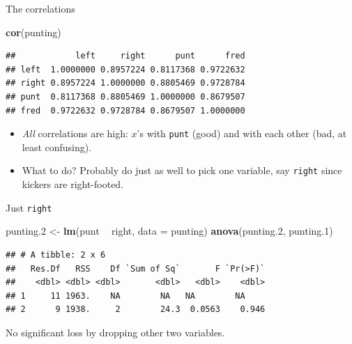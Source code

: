 \documentclass[
  ignorenonframetext,
]{beamer}
\newenvironment{Shaded}{\begin{snugshade}}{\end{snugshade}}
\newcommand{\DataTypeTok}[1]{\textcolor[rgb]{0.13,0.29,0.53}{#1}}
\newcommand{\FloatTok}[1]{\textcolor[rgb]{0.00,0.00,0.81}{#1}}
\newcommand{\KeywordTok}[1]{\textcolor[rgb]{0.13,0.29,0.53}{\textbf{#1}}}
\newcommand{\NormalTok}[1]{#1}
\newcommand{\OperatorTok}[1]{\textcolor[rgb]{0.81,0.36,0.00}{\textbf{#1}}}
\newcommand{\StringTok}[1]{\textcolor[rgb]{0.31,0.60,0.02}{#1}}
\begin{document}
\begin{frame}[fragile]{The correlations}
\protect\hypertarget{the-correlations}{}

\begin{Shaded}
\begin{Highlighting}[]
\KeywordTok{cor}\NormalTok{(punting)}
\end{Highlighting}
\end{Shaded}

\begin{verbatim}
##            left     right      punt      fred
## left  1.0000000 0.8957224 0.8117368 0.9722632
## right 0.8957224 1.0000000 0.8805469 0.9728784
## punt  0.8117368 0.8805469 1.0000000 0.8679507
## fred  0.9722632 0.9728784 0.8679507 1.0000000
\end{verbatim}

\begin{itemize}
\item
  \emph{All} correlations are high: \(x\)'s with \texttt{punt} (good)
  and with each other (bad, at least confusing).
\item
  What to do? Probably do just as well to pick one variable, say
  \texttt{right} since kickers are right-footed.
\end{itemize}

\end{frame}

\begin{frame}[fragile]{Just \texttt{right}}
\protect\hypertarget{just-right}{}

\small

\begin{Shaded}
\begin{Highlighting}[]
\NormalTok{punting}\FloatTok{.2}\NormalTok{ <-}\StringTok{ }\KeywordTok{lm}\NormalTok{(punt }\OperatorTok{~}\StringTok{ }\NormalTok{right, }\DataTypeTok{data =}\NormalTok{ punting)}
\KeywordTok{anova}\NormalTok{(punting}\FloatTok{.2}\NormalTok{, punting}\FloatTok{.1}\NormalTok{)}
\end{Highlighting}
\end{Shaded}

\begin{verbatim}
## # A tibble: 2 x 6
##   Res.Df   RSS    Df `Sum of Sq`       F `Pr(>F)`
##    <dbl> <dbl> <dbl>       <dbl>   <dbl>    <dbl>
## 1     11 1963.    NA        NA   NA        NA    
## 2      9 1938.     2        24.3  0.0563    0.946
\end{verbatim}

\normalsize

No significant loss by dropping other two variables.

\end{frame}
\end{document}
